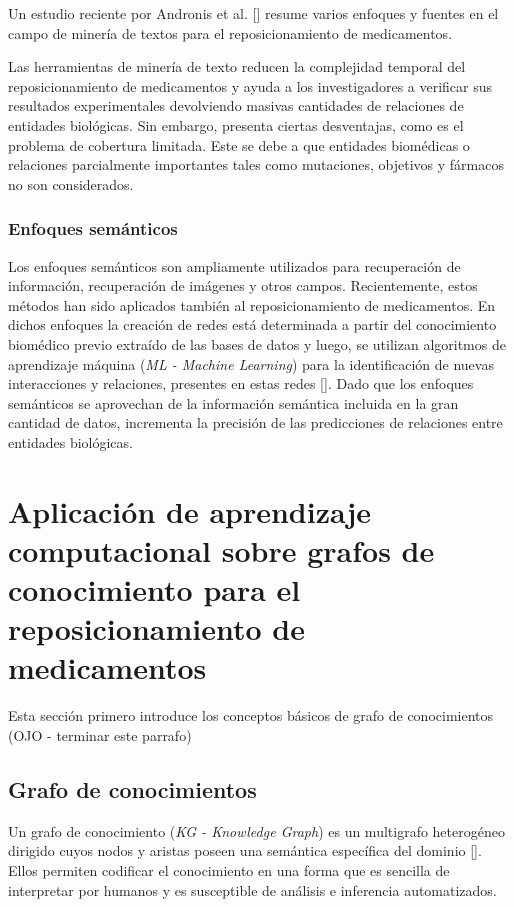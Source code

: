 Un estudio reciente por Andronis et al. [\cite{mining}] resume varios enfoques y fuentes en el campo de minería de textos para el reposicionamiento de medicamentos.

Las herramientas de minería de texto reducen la complejidad temporal del reposicionamiento de medicamentos y ayuda a los investigadores a verificar sus resultados experimentales devolviendo masivas cantidades de relaciones de entidades biológicas. Sin embargo, presenta ciertas desventajas, como es el problema de cobertura limitada. Este se debe a que entidades biomédicas o relaciones parcialmente importantes tales como mutaciones, objetivos y fármacos no son considerados.

\subsubsection{Enfoques semánticos}
Los enfoques semánticos son ampliamente utilizados para recuperación de información, recuperación de imágenes y otros campos. Recientemente, estos métodos han sido aplicados también al reposicionamiento de medicamentos. En dichos enfoques la creación de redes está determinada a partir del conocimiento biomédico previo extraído de las bases de datos y luego, se utilizan algoritmos de aprendizaje máquina (\textit{ML - Machine Learning}) para la identificación de nuevas interacciones y relaciones, presentes en estas redes [\cite{xue}]. Dado que los enfoques semánticos se aprovechan de la información semántica incluida en la gran cantidad de datos, incrementa la precisión de las predicciones de relaciones entre entidades biológicas.

\section{Aplicación de aprendizaje computacional sobre grafos de conocimiento para el reposicionamiento de medicamentos}

Esta sección primero introduce los conceptos básicos de grafo de conocimientos (OJO - terminar este parrafo)

\subsection{Grafo de conocimientos}
Un grafo de conocimiento (\textit{KG - Knowledge Graph}) es un multigrafo heterogéneo dirigido cuyos nodos y aristas poseen una semántica específica del dominio [\cite{dglke}]. Ellos permiten codificar el conocimiento en una forma que es sencilla de interpretar por humanos y es susceptible de análisis e inferencia automatizados.

